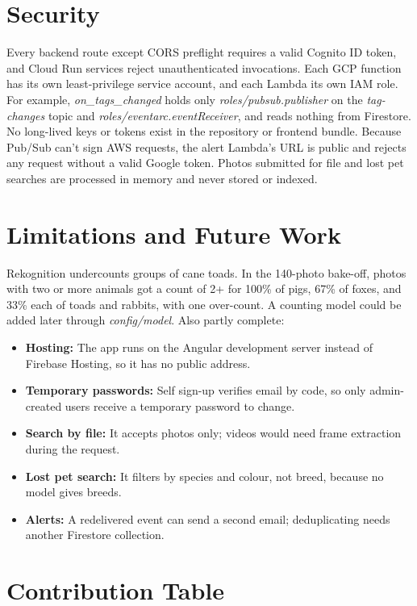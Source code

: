 \documentclass[12pt,a4paper]{article}
\newcommand{\code}[1]{\textit{#1}} %
\begin{document}
\section{Security}

Every backend route except CORS preflight requires a valid Cognito ID token, and Cloud Run services reject unauthenticated invocations. Each GCP function has its own least-privilege service account, and each Lambda its own IAM role. For example, \code{on\_tags\_changed} holds only \code{roles/pubsub.publisher} on the \code{tag-changes} topic and \code{roles/eventarc.eventReceiver}, and reads nothing from Firestore. No long-lived keys or tokens exist in the repository or frontend bundle. Because Pub/Sub can't sign AWS requests, the alert Lambda's URL is public and rejects any request without a valid Google token. Photos submitted for file and lost pet searches are processed in memory and never stored or indexed.

\section{Limitations and Future Work}

Rekognition undercounts groups of cane toads. In the 140-photo bake-off, photos with two or more animals got a count of 2+ for 100\% of pigs, 67\% of foxes, and 33\% each of toads and rabbits, with one over-count. A counting model could be added later through \code{config/model}. Also partly complete:

\begin{itemize}
  \item \textbf{Hosting:} The app runs on the Angular development server instead of Firebase Hosting, so it has no public address.
  \item \textbf{Temporary passwords:} Self sign-up verifies email by code, so only admin-created users receive a temporary password to change.
  \item \textbf{Search by file:} It accepts photos only; videos would need frame extraction during the request.
  \item \textbf{Lost pet search:} It filters by species and colour, not breed, because no model gives breeds.
  \item \textbf{Alerts:} A redelivered event can send a second email; deduplicating needs another Firestore collection.
\end{itemize}

\section{Contribution Table}
\end{document}
